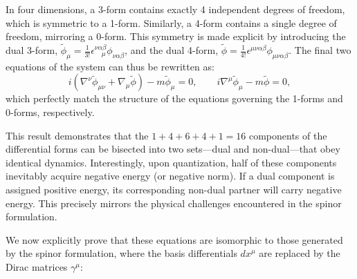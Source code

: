 In four dimensions, a 3-form contains exactly 4 independent degrees of freedom, which is symmetric to a 1-form. Similarly, a 4-form contains a single degree of freedom, mirroring a 0-form. This symmetry is made explicit by introducing the dual 3-form, $\tilde\phi_\mu=\frac{1}{3!}\epsilon^{\nu\alpha\beta}_{\quad \mu}\phi_{\nu\alpha\beta}$, and the dual 4-form, $\tilde\phi=\frac{1}{4!}\epsilon^{\mu\nu\alpha\beta}\phi_{\mu\nu\alpha\beta}$. The final two equations of the system can thus be rewritten as: 
\begin{equation}
    i(\nabla^\nu\tilde\phi_{\mu\nu}+\nabla_\mu\tilde\phi)-m\tilde\phi_\mu=0,\qquad
    i\nabla^\mu\tilde\phi_\mu-m\tilde\phi=0,
\end{equation}
which perfectly match the structure of the equations governing the 1-forms and 0-forms, respectively. 

This result demonstrates that the $1+4+6+4+1=16$ components of the differential forms can be bisected into two sets—dual and non-dual—that obey identical dynamics. Interestingly, upon quantization, half of these components inevitably acquire negative energy (or negative norm). If a dual component is assigned positive energy, its corresponding non-dual partner will carry negative energy. This precisely mirrors the physical challenges encountered in the spinor formulation.

We now explicitly prove that these equations are isomorphic to those generated by the spinor formulation, where the basis differentials $dx^\mu$ are replaced by the Dirac matrices $\gamma^\mu$: 

